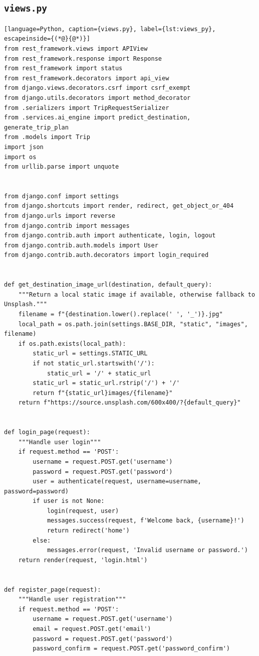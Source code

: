 \subsection{\texttt{views.py}}
\begin{lstlisting}[language=Python, caption={views.py}, label={lst:views_py}, escapeinside={(*@}{@*)}]
from rest_framework.views import APIView
from rest_framework.response import Response
from rest_framework import status
from rest_framework.decorators import api_view
from django.views.decorators.csrf import csrf_exempt
from django.utils.decorators import method_decorator
from .serializers import TripRequestSerializer
from .services.ai_engine import predict_destination, generate_trip_plan
from .models import Trip
import json
import os
from urllib.parse import unquote


from django.conf import settings
from django.shortcuts import render, redirect, get_object_or_404
from django.urls import reverse
from django.contrib import messages
from django.contrib.auth import authenticate, login, logout
from django.contrib.auth.models import User
from django.contrib.auth.decorators import login_required


def get_destination_image_url(destination, default_query):
    """Return a local static image if available, otherwise fallback to Unsplash."""
    filename = f"{destination.lower().replace(' ', '_')}.jpg"
    local_path = os.path.join(settings.BASE_DIR, "static", "images", filename)
    if os.path.exists(local_path):
        static_url = settings.STATIC_URL
        if not static_url.startswith('/'):
            static_url = '/' + static_url
        static_url = static_url.rstrip('/') + '/'
        return f"{static_url}images/{filename}"
    return f"https://source.unsplash.com/600x400/?{default_query}"


def login_page(request):
    """Handle user login"""
    if request.method == 'POST':
        username = request.POST.get('username')
        password = request.POST.get('password')
        user = authenticate(request, username=username, password=password)
        if user is not None:
            login(request, user)
            messages.success(request, f'Welcome back, {username}!')
            return redirect('home')
        else:
            messages.error(request, 'Invalid username or password.')
    return render(request, 'login.html')


def register_page(request):
    """Handle user registration"""
    if request.method == 'POST':
        username = request.POST.get('username')
        email = request.POST.get('email')
        password = request.POST.get('password')
        password_confirm = request.POST.get('password_confirm')
        

\end{lstlisting}
